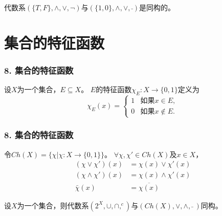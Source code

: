 \documentclass{beamer}
\begin{document}
\begin{CJK*}{UTF8}{gbsn}
\begin{frame}
代数系$(\{T,F\},\land,\lor,\lnot)$与$(\{1,0\},\land, \lor,\bar{ })$是同构的。
\end{frame}

\section{集合的特征函数}
\begin{frame}
  \frametitle{8. 集合的特征函数}
  \begin{Def}
    设$X$为一个集合，$E \subseteq X$。 $E$的\alert{特征函数}$\chi_E:X\to \{0,1\}$定义为
    \begin{equation*}
      \chi_E(x)=
      \begin{cases}
        1 & \text{如果} x \in E,\\
        0 & \text{如果} x \notin E.
      \end{cases}
    \end{equation*}
  \end{Def}
\end{frame}
\begin{frame}
  \frametitle{8. 集合的特征函数}
  \begin{Def}
    令$Ch(X) = \{\chi |\chi:X \to \{0,1\}\}$。
    $\forall \chi, \chi' \in Ch(X)$及$x \in X$，
    \begin{align}
      (\chi \lor \chi')(x) &= \chi(x) \lor \chi'(x)\nonumber\\
      (\chi \land \chi')(x) &= \chi(x) \land \chi'(x)\nonumber\\
      \bar{\chi}(x) &=   \overline{\chi(x)}
    \end{align}
  \end{Def}
  \begin{Thm}
    设$X$为一个集合，则代数系$(2^X, \cup, \cap, ^c)$与$(Ch(X), \lor, \land, \bar{} \ )$同构。
  \end{Thm}
\end{frame}


\end{CJK*}
\end{document}

